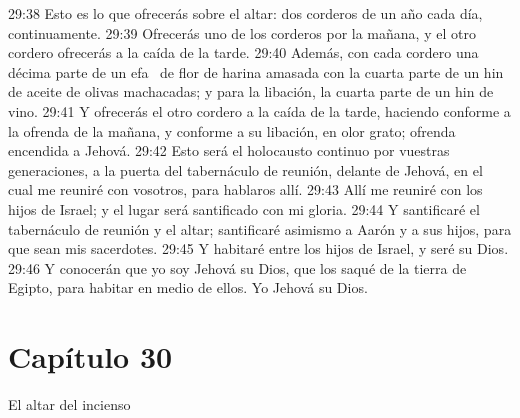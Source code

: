29:38 Esto es lo que ofrecerás sobre el altar: dos corderos de un año cada día, continuamente. 
29:39 Ofrecerás uno de los corderos por la mañana, y el otro cordero ofrecerás a la caída de la tarde. 
29:40 Además, con cada cordero una décima parte de un efa  de flor de harina amasada con la cuarta parte de un hin de aceite de olivas machacadas; y para la libación, la cuarta parte de un hin de vino. 
29:41 Y ofrecerás el otro cordero a la caída de la tarde, haciendo conforme a la ofrenda de la mañana, y conforme a su libación, en olor grato; ofrenda encendida a Jehová. 
29:42 Esto será el holocausto continuo por vuestras generaciones, a la puerta del tabernáculo de reunión, delante de Jehová, en el cual me reuniré con vosotros, para hablaros allí. 
29:43 Allí me reuniré con los hijos de Israel; y el lugar será santificado con mi gloria. 
29:44 Y santificaré el tabernáculo de reunión y el altar; santificaré asimismo a Aarón y a sus hijos, para que sean mis sacerdotes. 
29:45 Y habitaré entre los hijos de Israel, y seré su Dios. 
29:46 Y conocerán que yo soy Jehová su Dios, que los saqué de la tierra de Egipto, para habitar en medio de ellos. Yo Jehová su Dios. 
\section*{Capítulo 30}
El altar del incienso 


